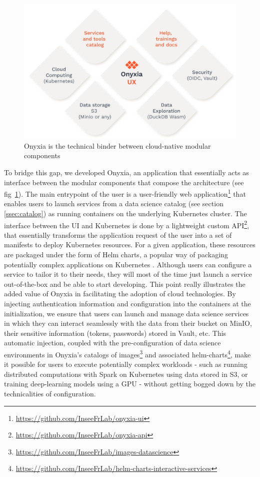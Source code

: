 \begin{figure}[htbp]
    \centering
    \includegraphics[width=\linewidth]{sections/img/onyxia-components.png}
    \caption{Onyxia is the technical binder between cloud-native modular components}
    \label{fig:onyxia-components}
\end{figure}

To bridge this gap, we developed Onyxia, an application that essentially acts as interface between the modular components that compose the architecture (see fig~\ref{fig:onyxia-components}). The main entrypoint of the user is a user-friendly web application\footnote{\url{https://github.com/InseeFrLab/onyxia-ui}} that enables users to launch services from a data science catalog (see section \ref{ssec:catalog}) as running containers on the underlying Kubernetes cluster. The interface between the UI and Kubernetes is done by a lightweight custom API\footnote{\url{https://github.com/InseeFrLab/onyxia-api}}, that essentially transforms the application request of the user into a set of manifests to deploy Kubernetes resources. For a given application, these resources are packaged under the form of Helm charts, a popular way of packaging potentially complex applications on Kubernetes \cite{gokhale2021creating}. Although users can configure a service to tailor it to their needs, they will most of the time just launch a service out-of-the-box and be able to start developing. This point really illustrates the added value of Onyxia in facilitating the adoption of cloud technologies. By injecting authentication information and configuration into the containers at the initialization, we ensure that users can launch and manage data science services in which they can interact seamlessly with the data from their bucket on MinIO, their sensitive information (tokens, passwords) stored in Vault, etc. This automatic injection, coupled with the pre-configuration of data science environments in Onyxia's catalogs of images\footnote{\url{https://github.com/InseeFrLab/images-datascience}} and associated helm-charts\footnote{\url{https://github.com/InseeFrLab/helm-charts-interactive-services}}, make it possible for users to execute potentially complex workloads - such as running distributed computations with Spark on Kubernetes using data stored in S3, or training deep-learning models using a GPU - without getting bogged down by the technicalities of configuration.

